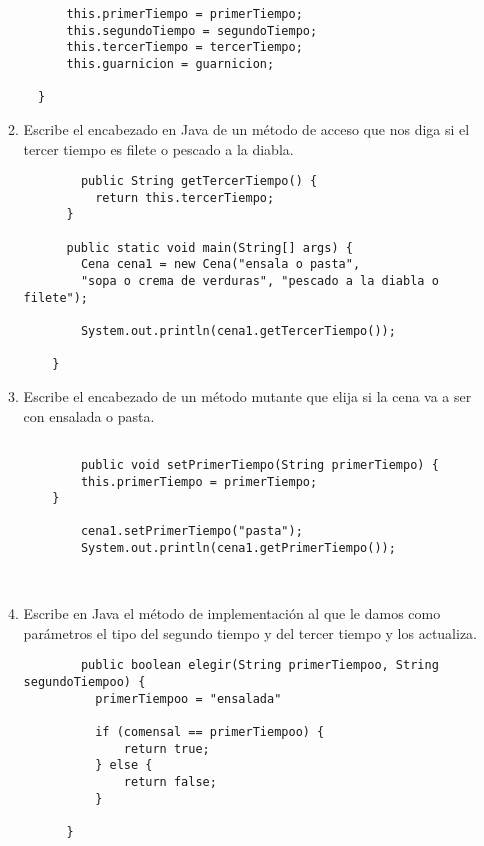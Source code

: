 \documentclass[a4paper,10pt]{article}
\begin{document}
\begin{enumerate}
\begin{enumerate}
\begin{lstlisting}
      this.primerTiempo = primerTiempo;
      this.segundoTiempo = segundoTiempo;
      this.tercerTiempo = tercerTiempo;
      this.guarnicion = guarnicion;

  }
       \end{lstlisting}
       

      \item Escribe el encabezado en Java de un método de acceso que nos diga si el tercer tiempo es filete o pescado
      a la diabla.

      \begin{lstlisting}
        public String getTercerTiempo() {
          return this.tercerTiempo;
      }

      public static void main(String[] args) {
        Cena cena1 = new Cena("ensala o pasta", 
        "sopa o crema de verduras", "pescado a la diabla o filete");

        System.out.println(cena1.getTercerTiempo());

    }
      \end{lstlisting}
\newpage
      \item Escribe el encabezado de un método mutante que elija si la cena va a ser con ensalada o pasta.
      
      \begin{lstlisting}

        public void setPrimerTiempo(String primerTiempo) {
        this.primerTiempo = primerTiempo;
    }

        cena1.setPrimerTiempo("pasta");
        System.out.println(cena1.getPrimerTiempo());

        
      \end{lstlisting}

      \item Escribe en Java el método de implementación al que le damos como parámetros el tipo del segundo tiempo
      y del tercer tiempo y los actualiza.

      \begin{lstlisting}
        public boolean elegir(String primerTiempoo, String segundoTiempoo) {
          primerTiempoo = "ensalada"
  
          if (comensal == primerTiempoo) {
              return true;
          } else {
              return false;
          }
  
      }
      \end{lstlisting}
      
      


    \end{enumerate}
    



\end{enumerate}
\end{document}
